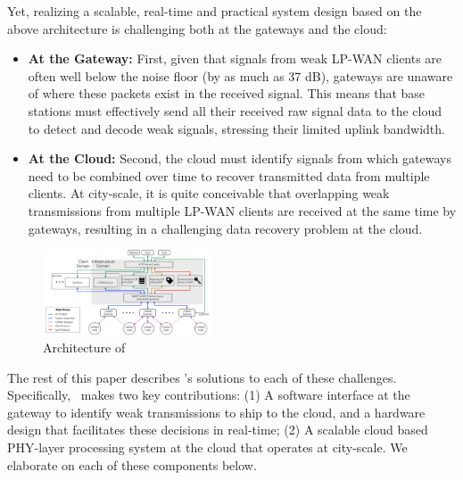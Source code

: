 Yet, realizing a scalable, real-time and practical system design based on the above architecture is challenging both at the gateways and the cloud: 
\begin{itemize}
\item {\bf At the Gateway: } First, given that signals from weak LP-WAN clients are often well below the noise floor (by as much as 37 dB), gateways are unaware of where these packets exist in the received signal. This means that base stations must effectively send all their received raw signal data to the cloud to detect and decode weak signals, stressing their limited uplink bandwidth. 
\item {\bf At the Cloud: } Second, the cloud must identify signals from which gateways need to be combined over time to recover transmitted data from multiple clients. At city-scale, it is quite conceivable that overlapping weak transmissions from multiple LP-WAN clients are received at the same time by gateways, resulting in a challenging data recovery problem at the cloud.
\end{itemize}


\begin{figure}[!htb]
    \centering
    \includegraphics[width=0.45\textwidth]{figures/openChirp_architecture.pdf}
    \caption{Architecture of \name}
    \label{fig:architecture}
\end{figure}


 The rest of this paper describes \name's solutions to each of these challenges. Specifically, \name\ makes two key contributions: (1) A software interface at the gateway to identify weak transmissions to ship to the cloud, and a hardware design that facilitates these decisions in real-time; (2) A scalable cloud based PHY-layer processing system at the cloud that operates at city-scale. We elaborate on each of these components below. 





